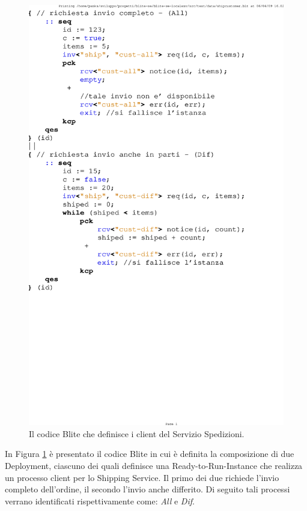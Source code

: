 \begin{figure}[t!]
\begin{center}
  \includegraphics[scale=0.80,clip]{blide/dia/clients}
   \caption[Codice Blite, Clienti del Servizio Spedizioni]{Il codice Blite che
   definisce i client del Servizio Spedizioni.}
  \label{fig:clients}
\end{center}
\end{figure}

In Figura \ref{fig:clients} è presentato il codice Blite in cui è definita la
composizione di due Deployment, ciascuno dei quali definisce una
Ready-to-Run-Instance che realizza un processo client per lo Shipping Service.
Il primo dei due richiede l'invio completo dell'ordine, il secondo l'invio
anche differito. Di seguito tali processi verrano identificati rispettivamente
come: \emph{All} e \emph{Dif}.

